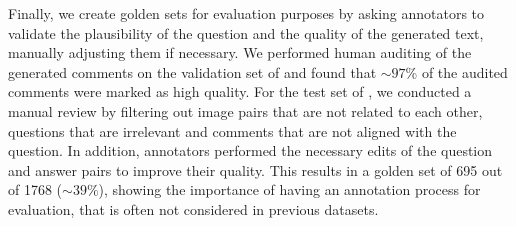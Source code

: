 Finally, we create golden sets for evaluation purposes by asking annotators to validate the plausibility of the question and the quality of the generated text, manually adjusting them if necessary.
We performed human auditing of the generated comments on the validation set of \cirrcomment and found that $\sim\!97\%$ of the audited comments were marked as high quality.
For the test set of \wikicomment, we conducted a manual review by filtering out image pairs that are not related to each other, questions that are irrelevant and comments that are not aligned with the question.
In addition, annotators performed the necessary edits of the question and answer pairs to improve their quality.
This results in a golden set of 695 out of 1768 ($\sim\!39\%$), showing the importance of having an annotation process for evaluation, that is often not considered in previous datasets. 
